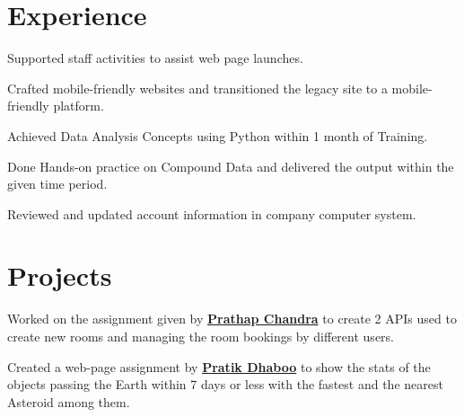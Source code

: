 \documentclass[]{deedy-resume-openfont}
\begin{document}
\hfill
\begin{minipage}[t]{0.66\textwidth} 


\section{Experience}
\sectionsep

\vspace{\topsep} %
\begin{tightemize}
\item Supported staff activities to assist web page launches.
\item Crafted mobile-friendly websites and transitioned the legacy site to a mobile-friendly platform.
\end{tightemize}
\vspace{\topsep} %
\begin{tightemize}
\item Achieved Data Analysis Concepts using Python within 1 month of Training.
\item Done Hands-on practice on Compound Data and delivered the output within the given time period.
\item Reviewed and updated account information in company computer system.
\end{tightemize}
\sectionsep



\section{Projects}
Worked on the assignment given by  \textbf{\href{https://www.linkedin.com/in/prathapchandra/}{Prathap Chandra}} to create 2 APIs used to create new rooms and managing the room bookings by different users.  
\sectionsep

Created a web-page assignment by 
\textbf{\href{https://www.linkedin.com/in/pratik2222}{Pratik Dhaboo}} to show the stats of the objects passing the Earth within 7 days or less with the fastest and the nearest Asteroid among them. 
\sectionsep


\end{minipage}
\end{document}
